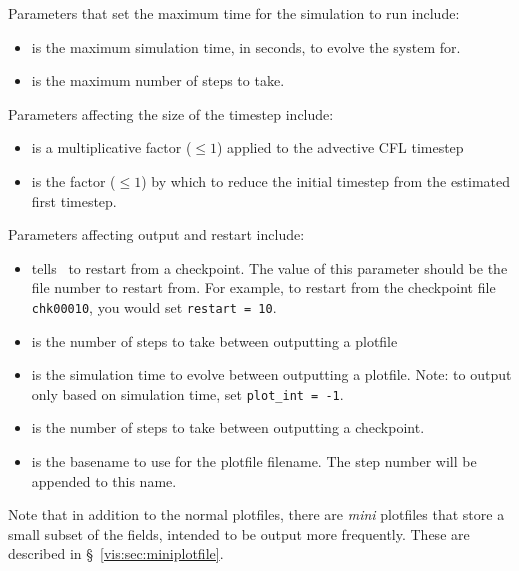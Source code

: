 Parameters that set the maximum time for the simulation to run
include:
\begin{itemize}
\item {} is the maximum simulation time, in seconds,
      to evolve the system for.

\item {} is the maximum number of steps to take.
\end{itemize}

\noindent Parameters affecting the size of the timestep include:
\begin{itemize}
\item {} is a multiplicative factor ({\tt $\le 1$}) 
      applied to the advective CFL timestep

\item {} is the factor ({\tt $\le 1$}) by which to reduce 
      the initial timestep from the estimated first timestep.
\end{itemize}

\noindent Parameters affecting output and restart include:
\begin{itemize}

\item {} tells \maestro\ to restart from a checkpoint.  The
      value of this parameter should be the file number to restart from.
      For example, to restart from the checkpoint file {\tt chk00010},
      you would set {\tt restart = 10}.

\item {} is the number of steps to take between
  outputting a plotfile

\item {} is the simulation time to evolve between
  outputting a plotfile.  Note: to output only based on simulation
  time, set {\tt plot\_int = -1}.

\item {} is the number of steps to take between
  outputting a checkpoint.

\item {} is the basename to use for the
  plotfile filename.  The step number will be appended to
  this name.

\end{itemize}

Note that in addition to the normal plotfiles, there are {\em mini} plotfiles
that store a small subset of the fields, intended to be output more frequently.
These are described in \S~\ref{vis:sec:miniplotfile}.

